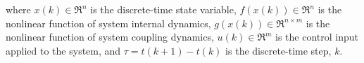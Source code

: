 \noindent where $x(k) \in \mathfrak{R}^n$ is the discrete-time state variable,
$f(x(k)) \in \mathfrak{R}^n$ is the nonlinear function of system internal dynamics,
$g(x(k)) \in \mathfrak{R}^{n \times m}$ is the nonlinear function of system coupling dynamics,
$u(k) \in \mathfrak{R}^m$ is the control input applied to the system,
and $\tau = t(k+1) - t(k)$ is the discrete-time step, $k$.
